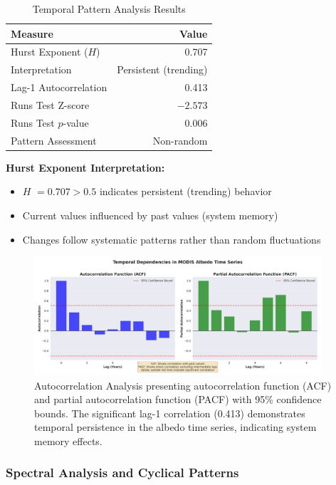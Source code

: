 \documentclass[12pt,a4paper]{article}
\newcommand{\pvalue}{$p$-value}
\newcommand{\hurst}{$H$}
\begin{document}
\begin{table}[H]
\centering
\caption{Temporal Pattern Analysis Results}
\label{tab:temporal_patterns}
\begin{tabular}{@{}lr@{}}
\toprule
\textbf{Measure} & \textbf{Value} \\
\midrule
Hurst Exponent (\hurst) & 0.707 \\
Interpretation & Persistent (trending) \\
Lag-1 Autocorrelation & 0.413 \\
Runs Test Z-score & $-2.573$ \\
Runs Test \pvalue & 0.006 \\
Pattern Assessment & Non-random \\
\bottomrule
\end{tabular}
\end{table}

\textbf{Hurst Exponent Interpretation:}
\begin{itemize}
    \item \hurst{} $= 0.707 > 0.5$ indicates persistent (trending) behavior
    \item Current values influenced by past values (system memory)
    \item Changes follow systematic patterns rather than random fluctuations
\end{itemize}

\begin{figure}[H]
\centering
\includegraphics[width=0.95\textwidth]{../../results/advanced_plots/autocorrelation_analysis.png}
\caption{Autocorrelation Analysis presenting autocorrelation function (ACF) and partial autocorrelation function (PACF) with 95\% confidence bounds. The significant lag-1 correlation (0.413) demonstrates temporal persistence in the albedo time series, indicating system memory effects.}
\label{fig:autocorrelation}
\end{figure}

\subsubsection{Spectral Analysis and Cyclical Patterns}
\end{document}
